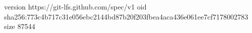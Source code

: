 version https://git-lfs.github.com/spec/v1
oid sha256:773c4b717c31e056ebc2144bd87b20f203fbea4aca436e061ee7cf7178002783
size 87544
